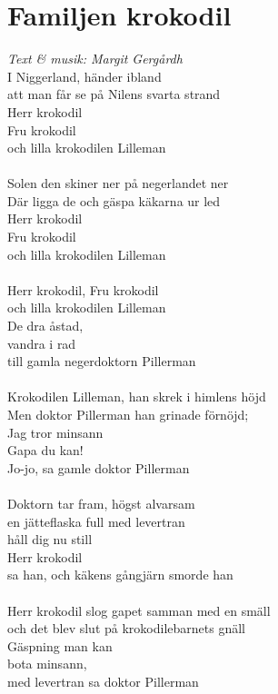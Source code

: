 \section{Familjen krokodil}
\textit{Text \& musik: Margit Gergårdh}
\vspace{2mm}\\
I Niggerland, händer ibland\\
att man får se på Nilens svarta strand\\
Herr krokodil\\
Fru krokodil\\
och lilla krokodilen Lilleman\\
\\
Solen den skiner ner på negerlandet ner\\
Där ligga de och gäspa käkarna ur led\\
Herr krokodil\\
Fru krokodil\\
och lilla krokodilen Lilleman\\
\\
Herr krokodil, Fru krokodil\\
och lilla krokodilen Lilleman\\
De dra åstad,\\
vandra i rad\\
till gamla negerdoktorn Pillerman\\
\\
Krokodilen Lilleman, han skrek i himlens höjd\\
Men doktor Pillerman han grinade förnöjd;\\
Jag tror minsann\\
Gapa du kan!\\
Jo-jo, sa gamle doktor Pillerman\\
\\
Doktorn tar fram, högst alvarsam\\
en jätteflaska full med levertran\\
håll dig nu still\\
Herr krokodil\\
sa han, och käkens gångjärn smorde han\\
\\
Herr krokodil slog gapet samman med en smäll\\
och det blev slut på krokodilebarnets gnäll\\
Gäspning man kan\\
bota minsann,\\
med levertran sa doktor Pillerman

